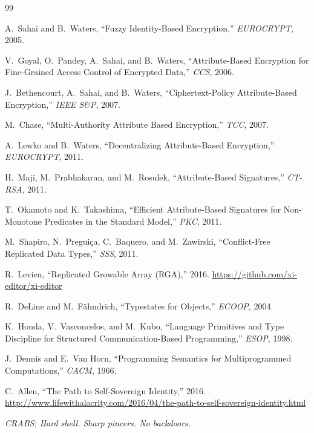 \documentclass[sigconf,nonacm]{acmart}
\newcommand{\crab}{\textsc{CRABS}}
\begin{document}
\begin{thebibliography}{99}

A.~Sahai and B.~Waters, ``Fuzzy Identity-Based Encryption,'' \textit{EUROCRYPT}, 2005.

V.~Goyal, O.~Pandey, A.~Sahai, and B.~Waters, ``Attribute-Based Encryption for Fine-Grained Access Control of Encrypted Data,'' \textit{CCS}, 2006.

J.~Bethencourt, A.~Sahai, and B.~Waters, ``Ciphertext-Policy Attribute-Based Encryption,'' \textit{IEEE S\&P}, 2007.

M.~Chase, ``Multi-Authority Attribute Based Encryption,'' \textit{TCC}, 2007.

A.~Lewko and B.~Waters, ``Decentralizing Attribute-Based Encryption,'' \textit{EUROCRYPT}, 2011.

H.~Maji, M.~Prabhakaran, and M.~Rosulek, ``Attribute-Based Signatures,'' \textit{CT-RSA}, 2011.

T.~Okamoto and K.~Takashima, ``Efficient Attribute-Based Signatures for Non-Monotone Predicates in the Standard Model,'' \textit{PKC}, 2011.

M.~Shapiro, N.~Pregui\c{c}a, C.~Baquero, and M.~Zawirski, ``Conflict-Free Replicated Data Types,'' \textit{SSS}, 2011.

R.~Levien, ``Replicated Growable Array (RGA),'' 2016. \url{https://github.com/xi-editor/xi-editor}

R.~DeLine and M.~F\"{a}hndrich, ``Typestates for Objects,'' \textit{ECOOP}, 2004.

K.~Honda, V.~Vasconcelos, and M.~Kubo, ``Language Primitives and Type Discipline for Structured Communication-Based Programming,'' \textit{ESOP}, 1998.

J.~Dennis and E.~Van Horn, ``Programming Semantics for Multiprogrammed Computations,'' \textit{CACM}, 1966.

C.~Allen, ``The Path to Self-Sovereign Identity,'' 2016. \url{http://www.lifewithalacrity.com/2016/04/the-path-to-self-sovereign-identity.html}

\end{thebibliography}

\vspace{12pt}
\begin{center}
\textit{\crab{}: Hard shell. Sharp pincers. No backdoors.}
\end{center}
\end{document}
